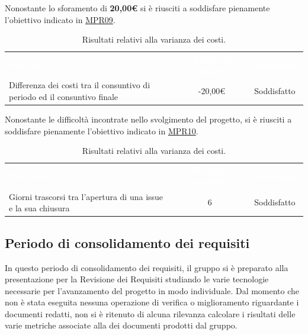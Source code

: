 Nonostante lo sforamento di \textbf{20,00€} si è riusciti a soddisfare pienamente l'obiettivo indicato in \hyperlink{MPR09}{MPR09}.
\begin{table} [H]
	\begin{center}
		\begin{tabular}{|C{6cm}|c|c|}
			\textcolor{white}{\textbf{Processo}}&
			\textcolor{white}{\textbf{Risultato ottenuto}}&
			\textcolor{white}{\textbf{Valutazione}}\\
			Differenza dei costi tra il consuntivo di periodo ed il consuntivo finale & -20,00€ & Soddisfatto\\ \hline
		\end{tabular}
	\end{center}
	\caption{\label{tab:MPR09Analisi}Risultati relativi alla varianza dei costi.}
\end{table}\noindent
Nonostante le difficoltà incontrate nello svolgimento del progetto, si è riusciti a soddisfare pienamente l'obiettivo indicato in \hyperlink{MPR10}{MPR10}.
\begin{table} [H]
	\begin{center}
		\begin{tabular}{|C{6cm}|c|c|}
			\textcolor{white}{\textbf{Processo}}&
			\textcolor{white}{\textbf{Risultato ottenuto}}&
			\textcolor{white}{\textbf{Valutazione}}\\
			Giorni trascorsi tra l'apertura di una issue e la sua chiusura & 6 & Soddisfatto\\ \hline
		\end{tabular}
	\end{center}
	\caption{\label{tab:MPR10Analisi}Risultati relativi alla varianza dei costi.}
\end{table}

\subsection{Periodo di consolidamento dei requisiti}
In questo periodo di consolidamento dei requisiti, il gruppo {\Gruppo} si è preparato alla presentazione per la Revisione dei Requisiti studiando le varie tecnologie necessarie per l'avanzamento del progetto in modo individuale. Dal momento che non è stata eseguita nessuna operazione di verifica o miglioramento riguardante i documenti redatti, non si è ritenuto di alcuna rilevanza calcolare i risultati delle varie metriche associate alla  dei documenti prodotti dal gruppo.
 
